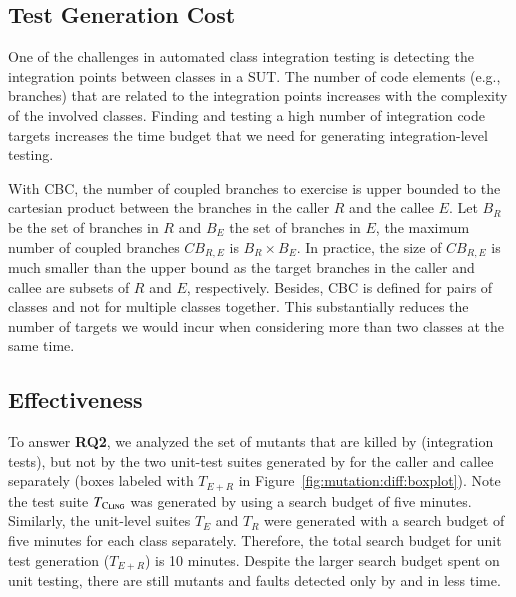 
\subsection{Test Generation Cost}

One of the challenges in automated class integration testing is detecting the integration points between classes in a SUT. The number of code elements (e.g., branches) that are related to the integration points increases with the complexity of the involved classes. Finding and testing a high number of integration code targets increases the time budget that we need for generating integration-level testing. 

With CBC, the number of coupled branches to exercise is upper bounded to the cartesian product between the branches in the caller $R$ and the callee $E$. Let $B_R$ be the set of branches in $R$ and $B_E$ the set of branches in $E$, the maximum number of coupled branches $CB_{R,E}$ is $B_R \times B_E$. In practice, the size of $CB_{R,E}$ is much smaller than the upper bound as the target branches in the caller and callee are subsets of $R$ and $E$, respectively. Besides, CBC is defined for pairs of classes and not for multiple classes together. This substantially reduces the number of targets we would incur when considering more than two classes at the same time.


\subsection{Effectiveness}

To answer \textbf{RQ2}, we analyzed the set of mutants that are killed by \cling (integration tests), but not by the two unit-test suites generated by \evosuite for the caller and callee separately (boxes labeled with $T_{E+R}$ in Figure~\ref{fig:mutation:diff:boxplot}). Note the test suite $T_\textsc{Cling}$ was generated by \cling using a search budget of five minutes. Similarly, the unit-level suites $T_{E}$ and $T_{R}$ were generated with a search budget of five minutes for each class separately. Therefore, the total search budget for unit test generation ($T_{E+R}$) is 10 minutes. Despite the larger search budget spent on unit testing, there are still mutants and faults detected only by \cling and in less time.

